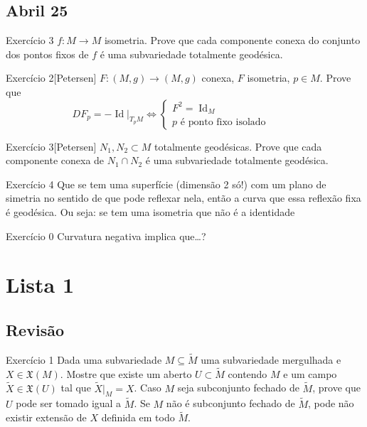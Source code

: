 \subsection{Abril 25}

\begin{thing4}{Exercício 3}\label{exer:}\leavevmode
\(f:M \to M\) isometria.
Prove que cada componente conexa do conjunto dos pontos fixos de \(f\) é uma subvariedade totalmente geodésica.
\end{thing4}

\begin{thing4}{Exercício 2}[Petersen]\label{exer:}\leavevmode
\(F:(M,g) \to (M,g)\) conexa, \(F\) isometria, \(p \in M\). Prove que
\[DF_p=-\operatorname{Id}|_{T_pM} \iff \begin{cases}
	F^2=\operatorname{Id}_M\qquad & \\
	p\text{ é ponto fixo isolado} \qquad &
\end{cases}\]
\end{thing4}

\begin{thing4}{Exercício 3}[Petersen]\label{exer:3}\leavevmode
\(N_1,N_2 \subset M\) totalmente geodésicas. Prove que cada componente conexa de \(N_1 \cap N_2\) é uma subvariedade totalmente geodésica.
\end{thing4}

\begin{thing4}{Exercício 4}\label{exer:4}\leavevmode
Que se tem uma superfície (dimensão 2 só!) com um plano de simetria no sentido de que pode reflexar nela, então a curva que essa reflexão fixa é geodésica. Ou seja: se tem uma isometria que não é a identidade
\end{thing4}

\begin{thing4}{Exercício 0}\label{exer:0}\leavevmode
Curvatura negativa implica que…?
\end{thing4}

\clearpage
\section{Lista 1}

\subsection{Revisão}

\begin{thing4}{Exercício 1}\label{exer:1}\leavevmode
Dada uma subvariedade \(M \subseteq \tilde{M}\) uma subvariedade mergulhada e \(X \in \mathfrak{X}(M)\). Mostre que existe um aberto \(U \subset \tilde{M}\) contendo \(M\) e um campo \(\tilde{X} \in \mathfrak{X}(U)\) tal que \(\tilde{X}|_{M}=X\). Caso \(M\) seja subconjunto fechado de \(\tilde{M}\), prove que \(U\) pode ser tomado igual a \(\tilde{M}\). Se \(M\) não é subconjunto fechado de \(\tilde{M}\), pode não existir extensão de \(X\) definida em todo \(\tilde{M}\).
\end{thing4}

